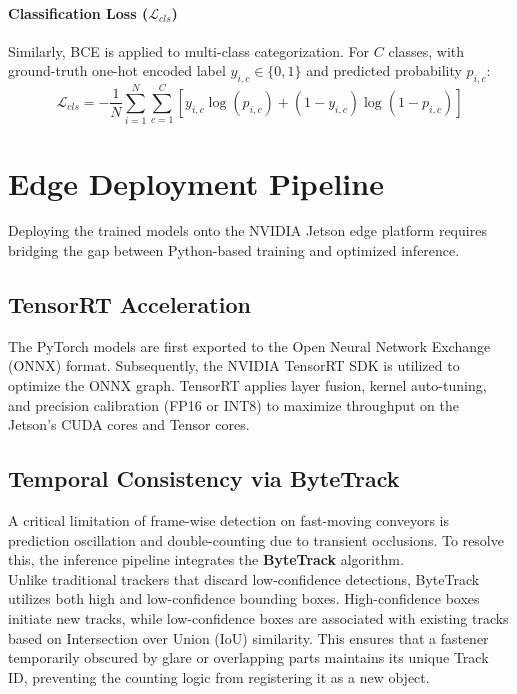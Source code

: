 \paragraph{Classification Loss ($\mathcal{L}_{cls}$)}
Similarly, BCE is applied to multi-class categorization. For $C$ classes, with ground-truth one-hot encoded label $y_{i,c} \in \{0, 1\}$ and predicted probability $p_{i,c}$:
\begin{equation}
    \mathcal{L}_{cls} = -\frac{1}{N} \sum_{i=1}^{N} \sum_{c=1}^{C} \left[ y_{i,c} \log(p_{i,c}) + (1 - y_{i,c}) \log(1 - p_{i,c}) \right]
\end{equation}

\section{Edge Deployment Pipeline}
\label{sec:deployment}

Deploying the trained models onto the NVIDIA Jetson edge platform requires bridging the gap between Python-based training and optimized inference.

\subsection{TensorRT Acceleration}

The PyTorch models are first exported to the Open Neural Network Exchange (ONNX) format. Subsequently, the NVIDIA TensorRT SDK is utilized to optimize the ONNX graph. TensorRT applies layer fusion, kernel auto-tuning, and precision calibration (FP16 or INT8) to maximize throughput on the Jetson's CUDA cores and Tensor cores.

\subsection{Temporal Consistency via ByteTrack}

A critical limitation of frame-wise detection on fast-moving conveyors is prediction oscillation and double-counting due to transient occlusions. To resolve this, the inference pipeline integrates the \textbf{ByteTrack} algorithm.\\

Unlike traditional trackers that discard low-confidence detections, ByteTrack utilizes both high and low-confidence bounding boxes. High-confidence boxes initiate new tracks, while low-confidence boxes are associated with existing tracks based on Intersection over Union (IoU) similarity. This ensures that a fastener temporarily obscured by glare or overlapping parts maintains its unique Track ID, preventing the counting logic from registering it as a new object.

